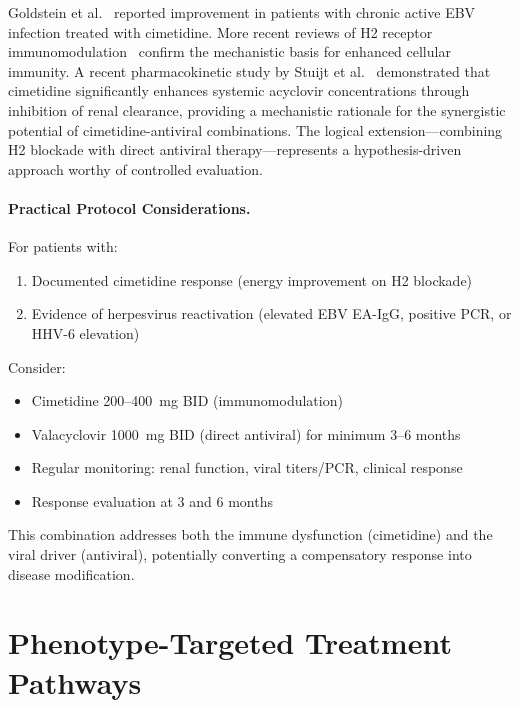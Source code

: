\begin{observation}
Goldstein et al.~\cite{Goldstein1986CimetidineEBV} reported improvement in patients with chronic active EBV infection treated with cimetidine. More recent reviews of H2 receptor immunomodulation~\cite{vanderPol2021H2ReceptorImmune} confirm the mechanistic basis for enhanced cellular immunity. A recent pharmacokinetic study by Stuijt et al.~\cite{Stuijt2026CimetidineAcyclovir} demonstrated that cimetidine significantly enhances systemic acyclovir concentrations through inhibition of renal clearance, providing a mechanistic rationale for the synergistic potential of cimetidine-antiviral combinations. The logical extension---combining H2 blockade with direct antiviral therapy---represents a hypothesis-driven approach worthy of controlled evaluation.
\end{observation}

\paragraph{Practical Protocol Considerations.}

For patients with:
\begin{enumerate}
    \item Documented cimetidine response (energy improvement on H2 blockade)
    \item Evidence of herpesvirus reactivation (elevated EBV EA-IgG, positive PCR, or HHV-6 elevation)
\end{enumerate}

Consider:
\begin{itemize}
    \item Cimetidine 200--400~mg BID (immunomodulation)
    \item Valacyclovir 1000~mg BID (direct antiviral) for minimum 3--6 months
    \item Regular monitoring: renal function, viral titers/PCR, clinical response
    \item Response evaluation at 3 and 6 months
\end{itemize}

This combination addresses both the immune dysfunction (cimetidine) and the viral driver (antiviral), potentially converting a compensatory response into disease modification.

\section{Phenotype-Targeted Treatment Pathways}
\label{sec:phenotype-pathways}

